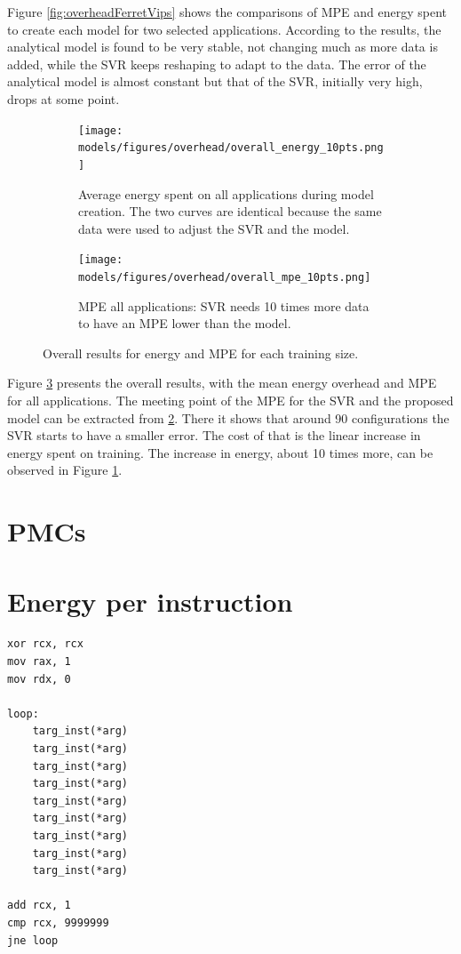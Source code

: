 Figure \ref{fig:overheadFerretVips} shows the comparisons of MPE and energy spent to create each model for two selected applications. According to the results, the analytical model is found to be very stable, not changing much as more data is added, while the SVR keeps reshaping to adapt to the data. 
The error of the analytical model is almost constant but that of  the SVR, initially very high, drops at some point.
\begin{figure}[H]
	\centering
	\begin{subfigure}[b]{0.44\textwidth}
		\centerline{\texttt{[image: models/figures/overhead/overall\_energy\_10pts.png]}}
		\caption{Average energy spent on all applications during model creation. The two curves are identical because the same data were used to adjust the SVR and the model.}
		\label{fig:overall_overhead}
	\end{subfigure}
	\quad
	\begin{subfigure}[b]{0.44\textwidth}
		\centerline{\texttt{[image: models/figures/overhead/overall\_mpe\_10pts.png]}}
		\caption{
			MPE all applications: SVR needs 10 times more data to have an MPE lower than the model.}
		\label{fig:overall_MPE}
	\end{subfigure}
	\caption{Overall results for energy and MPE for each training size.}
	\label{fig:overall_train}
\end{figure}
Figure \ref{fig:overall_train} presents the overall results, with the mean energy overhead and MPE for all applications.
The meeting point of the MPE for the SVR and the proposed model can be extracted from  \ref{fig:overall_MPE}.
There it shows that around 90 configurations the SVR starts to have a smaller error. The cost of that is the linear increase in energy spent on training. The increase in energy, about 10 times more, can be observed in Figure \ref{fig:overall_overhead}.


\section{PMCs}


\section{Energy per instruction}

\begin{lstlisting}
xor rcx, rcx
mov rax, 1
mov rdx, 0

loop:
	targ_inst(*arg)
	targ_inst(*arg)
	targ_inst(*arg)
	targ_inst(*arg)
	targ_inst(*arg)
	targ_inst(*arg)
	targ_inst(*arg)
	targ_inst(*arg)
	targ_inst(*arg)

add rcx, 1
cmp rcx, 9999999
jne loop
\end{lstlisting}

